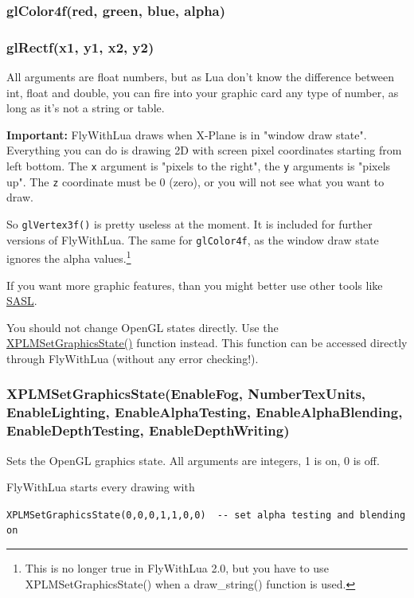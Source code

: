 \documentclass[11pt,parskip=half,a4paper]{scrartcl}
\begin{document}
\subsubsection{glColor4f(red, green, blue, alpha)}

\subsubsection{glRectf(x1, y1, x2, y2)}

All arguments are float numbers, but as Lua don't know the difference between int, float and double, you can fire into your graphic card any type of number, as long as it's not a string or table.

\textbf{Important:} FlyWithLua draws when X-Plane is in "window draw state". Everything you can do is drawing 2D with screen pixel coordinates starting from left bottom. The \verb|x| argument is "pixels to the right", the \verb|y| arguments is "pixels up". The \verb|z| coordinate must be 0 (zero), or you will not see what you want to draw.

So \verb|glVertex3f()| is pretty useless at the moment. It is included for further versions of FlyWithLua. The same for \verb|glColor4f|, as the window draw state ignores the alpha values.\footnote{This is no longer true in FlyWithLua 2.0, but you have to use XPLMSetGraphicsState() when a draw\_string() function is used.}

If you want more graphic features, than you might better use other tools like \href{http://code.google.com/p/sasl/}{SASL}.

You should not change OpenGL states directly. Use the \href{http://www.xsquawkbox.net/xpsdk/mediawiki/XPLMSetGraphicsState}{XPLMSetGraphicsState()} function instead. This function can be accessed directly through FlyWithLua (without any error checking!).

\subsubsection{XPLMSetGraphicsState(EnableFog, NumberTexUnits, EnableLighting, EnableAlphaTesting, EnableAlphaBlending, EnableDepthTesting, EnableDepthWriting)}

Sets the OpenGL graphics state. All arguments are integers, 1 is on, 0 is off.

FlyWithLua starts every drawing with

\verb|XPLMSetGraphicsState(0,0,0,1,1,0,0)  -- set alpha testing and blending on|
\end{document}
